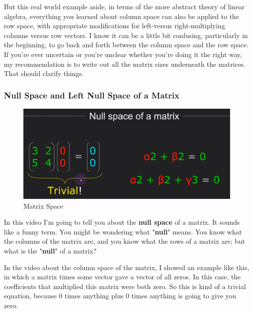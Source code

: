 \documentclass[fleqn,10pt]{olplainarticle}
\theoremstyle{definition}
\theoremstyle{remark}
\begin{document}
But this real world example aside, in terms of the more abstract theory of linear algebra, everything you learned about column space can also be applied to the row space, with appropriate modifications for left-versus right-multiplying columns versus row vectors. I know it can be a little bit confusing, particularly in the beginning, to go back and forth between the column space and the row space. If you're ever uncertain or you're unclear whether you're doing it the right way, my recommendation is to write out all the matrix sizes underneath the matrices. That should clarify things.

\pagebreak

\subsubsection*{Null Space and Left Null Space of a Matrix}

\begin{figure}[ht]
	\centering
	\includegraphics[width=0.5\linewidth]{images/matrix-space-17.png}
	\caption{Matrix Space}
	\label{fig:matrix_space_17}
\end{figure}

In this video I'm going to tell you about the \textbf{null space} of a matrix. It sounds like a funny term. You might be wondering what "\textbf{null}" means. You know what the columns of the matrix are, and you know what the rows of a matrix are; but what is the "\textbf{null}" of a matrix?

In the video about the column space of the matrix, I showed an example like this, in which a matrix times some vector gave a vector of all zeros. In this case, the coefficients that multiplied this matrix were both zero. So this is kind of a trivial equation, because 0 times anything plus 0 times anything is going to give you zero.
\end{document}
